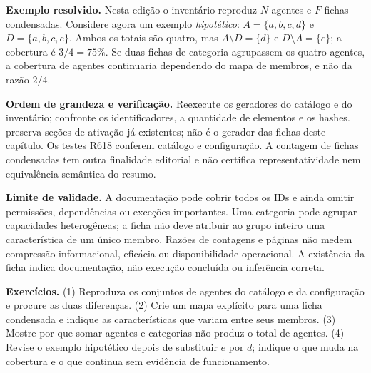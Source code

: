 \begin{resultado}
\textbf{Exemplo resolvido.} Nesta edição o inventário reproduz $N$ agentes e $F$
fichas condensadas. Considere agora um exemplo \emph{hipotético}:
$A=\{a,b,c,d\}$ e $D=\{a,b,c,e\}$. Ambos os totais são quatro, mas
$A\setminus D=\{d\}$ e $D\setminus A=\{e\}$; a cobertura é $3/4=75\%$.
Se duas fichas de categoria agrupassem os quatro agentes, a cobertura de agentes
continuaria dependendo do mapa de membros, e não da razão $2/4$.
\end{resultado}
\begin{resultado}
\textbf{Ordem de grandeza e verificação.} Reexecute os geradores do catálogo
e do inventário; confronte os identificadores, a quantidade de elementos e os
hashes.  preserva seções de ativação já existentes;
não é o gerador das fichas deste capítulo. Os testes R618 conferem catálogo e
configuração. A contagem de fichas condensadas tem outra finalidade editorial
e não certifica representatividade nem equivalência semântica do resumo.
\end{resultado}
\begin{aviso}
\textbf{Limite de validade.} A documentação pode cobrir todos os IDs e ainda
omitir permissões, dependências ou exceções importantes. Uma categoria pode
agrupar capacidades heterogêneas; a ficha não deve atribuir ao grupo inteiro
uma característica de um único membro. Razões de contagens e páginas não medem
compressão informacional, eficácia ou disponibilidade operacional. A existência
da ficha indica documentação, não execução concluída ou inferência correta.
\end{aviso}
\begin{resultado}
\textbf{Exercícios.} (1) Reproduza os conjuntos de agentes do catálogo e da
configuração e procure as duas diferenças. (2) Crie um mapa explícito para uma
ficha condensada e indique as características que variam entre seus membros.
(3) Mostre por que somar agentes e categorias não produz o total de agentes.
(4) Revise o exemplo hipotético depois de substituir $e$ por $d$; indique o que
muda na cobertura e o que continua sem evidência de funcionamento.
\end{resultado}

